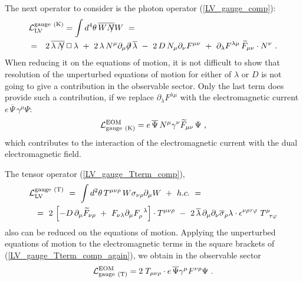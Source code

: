\documentclass[12pt]{revtex4}
\newcommand{\slashed}[1]{\hbox{{$#1$}\llap{$/$}}}
\begin{document}
The next operator to consider is the photon operator
(\ref{LV_gauge_comp}):
\begin{eqnarray}
\label{LV_gauge_comp_again}
\lefteqn{
\mathcal{L}_{\mathrm{LV}}^{\mathrm{gauge\ (K)}} =  
\int d^4\theta \, \overline{W \slashed{N}}W ~=~
} \\
\nonumber
& = &
2\, \overline{\lambda\,\slashed{N}}\, \Box\, 
   \lambda 
~+~
2\, \lambda\, N^\mu \partial_\mu \slashed{\partial}\, 
   \overline{\lambda} 
~-~ 
2\, D\, N_\mu \partial_\nu F^{\mu\nu}
~+~ 
\partial_\lambda F^{\lambda\mu}\, 
\widetilde{F}_{\mu\nu} \cdot N^\nu
~.
\end{eqnarray}
When reducing it on the equations of motion,
        it is not difficult to show that resolution of the 
unperturbed equations of motion for either of 
$ \lambda $ or $ D $ is not going to give a contribution
in the observable sector.
Only the last term does provide such a contribution,
if we replace 
$ \partial_\lambda F^{\lambda\mu} $ 
with the electromagnetic current 
$ e\, \overline{\Psi}\, \gamma^\mu \Psi $:
\begin{equation}
\label{LV_induced_by_gauge_K}
        \mathcal{L}_{\rm gauge\ (K)}^{\rm EOM} = 
 e\, \overline{\Psi}\, N^\mu \gamma^\nu
\widetilde{F}_{\mu\nu}\, \Psi~,
\end{equation}
        which contributes to the interaction of the electromagnetic
current with the dual electromagnetic field. 

The tensor operator (\ref{LV_gauge_Tterm_comp}),
\begin{eqnarray}
\nonumber
\lefteqn{
\mathcal{L}_{\mathrm{LV}}^{\mathrm{gauge\ (T)}}  ~=~ 
\int d^2\theta \, T^{\mu\nu\rho} \,
        W \sigma_{\nu\rho} \partial_\mu W  ~+~ h.c. ~=~ } \\
\label{LV_gauge_Tterm_comp_again}
        &&
        =~
2\,
\left[
   - D\, \partial_\mu \widetilde{F}_{\nu\rho} 
   ~+~
   F_{\nu\lambda}\partial_\mu F_\rho^{\phantom{\rho}\lambda}
\right] 
\cdot
	T^{\mu\nu\rho}
	~-~
	2\,
    	\overline{\lambda}\, \partial_\mu \partial_\nu
    	\overline{\sigma}_\rho \lambda
	\cdot
   	\epsilon^{\nu\rho\tau\varphi}
	\;
   	T^\mu_{\phantom{\mu}\tau\varphi}
\end{eqnarray}
        also can be reduced on the equations of motion.
Applying the unperturbed equations of motion to the 
electromagnetic terms in the square brackets of 
(\ref{LV_gauge_Tterm_comp_again}), we obtain in the
observable sector
\begin{eqnarray}
        \mathcal{L}_{\rm gauge\ (T)}^{\rm EOM} =  
\label{LV_induced_by_gauge_T}
	2\; T_{\mu\nu\rho} \cdot 
	e\, \overline{\Psi} \gamma^\mu F^{\nu\rho} \Psi
	~.
\end{eqnarray}
\end{document}
